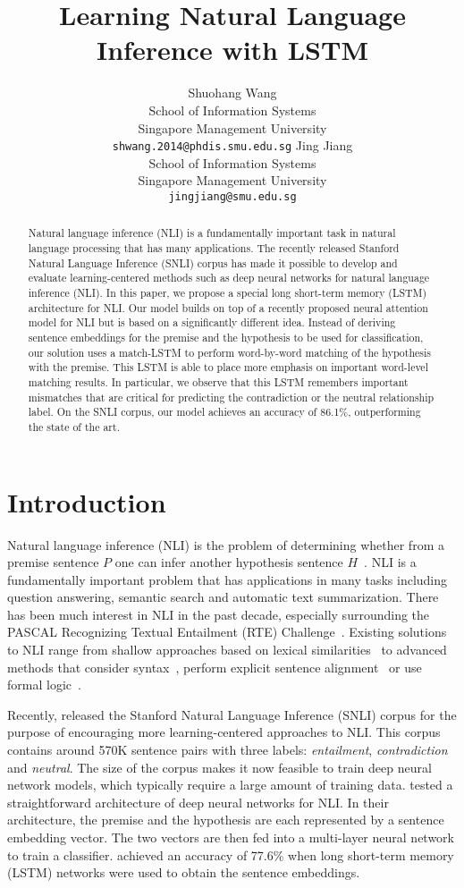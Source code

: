 \documentclass[11pt,letterpaper]{article}
\title{Learning Natural Language Inference with LSTM}
\author{Shuohang Wang\\
		School of Information Systems\\
		Singapore Management University\\
		\texttt{shwang.2014@phdis.smu.edu.sg}
	\And 
	Jing Jiang\\
	School of Information Systems\\
	Singapore Management University\\
	\texttt{jingjiang@smu.edu.sg}}
\date{}
\begin{document}
\maketitle


\begin{abstract}
Natural language inference (NLI) is a fundamentally important task in natural language processing that has many applications.
The recently released Stanford Natural Language Inference (SNLI) corpus has made it possible to develop and evaluate learning-centered methods such as deep neural networks for natural language inference (NLI).
In this paper, we propose a special long short-term memory (LSTM) architecture for NLI.
Our model builds on top of a recently proposed neural attention model for NLI but is based on a significantly different idea.
Instead of deriving sentence embeddings for the premise and the hypothesis to be used for classification, 
our solution uses a match-LSTM to perform word-by-word matching of the hypothesis with the premise.
This LSTM is able to place more emphasis on important word-level matching results.
In particular, we observe that this LSTM remembers important mismatches that are critical for predicting the contradiction or the neutral relationship label.
On the SNLI corpus, our model achieves an accuracy of 86.1\%, outperforming the state of the art.
\end{abstract}
\section{Introduction}

Natural language inference (NLI) is the problem of determining whether from a premise sentence $P$ one can infer another hypothesis sentence $H$~\cite{maccartney:09}.
NLI is a fundamentally important problem that has applications in many tasks including question answering, semantic search and automatic text summarization.
There has been much interest in NLI in the past decade, especially surrounding the PASCAL Recognizing Textual Entailment (RTE) Challenge~\cite{dagan:pascal05}. 
Existing solutions to NLI range from shallow approaches based on lexical similarities~\cite{glickman:pascal05} to advanced methods that consider syntax~\cite{mehdad:tac09}, perform explicit sentence alignment~\cite{maccartney:emnlp08} or use formal logic~\cite{clark:tac09}.

Recently,  released the Stanford Natural Language Inference (SNLI) corpus for the purpose of encouraging more learning-centered approaches to NLI.
This corpus contains around 570K sentence pairs with three labels: \emph{entailment}, \emph{contradiction} and \emph{neutral}.
The size of the corpus makes it now feasible to train deep neural network models, which typically require a large amount of training data.
 tested a straightforward architecture of deep neural networks for NLI.
In their architecture, the premise and the hypothesis are each represented by a sentence embedding vector.
The two vectors are then fed into a multi-layer neural network to train a classifier.
 achieved an accuracy of 77.6\% when long short-term memory (LSTM) networks were used to obtain the sentence embeddings.
\end{document}
